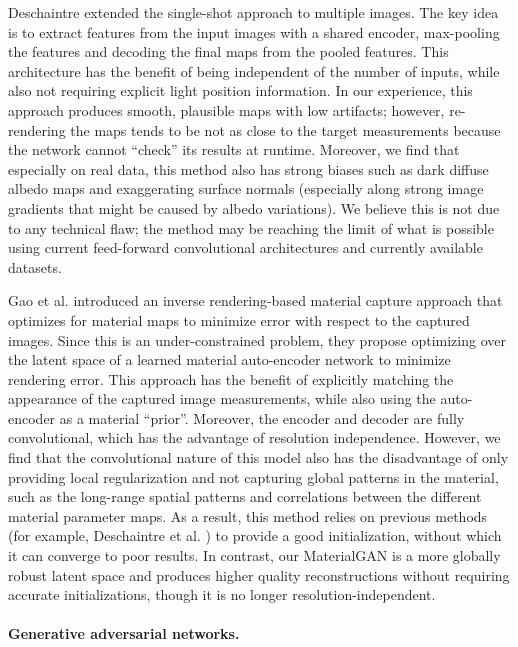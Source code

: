 Deschaintre \cite{deschaintre2019flexible} extended the single-shot approach to multiple images. The key idea is to extract features from the input images with a shared encoder, max-pooling the features and decoding the final maps from the pooled features. This architecture has the benefit of being independent of the number of inputs, while also not requiring explicit light position information. In our experience, this approach produces smooth, plausible maps with low artifacts; however, re-rendering the maps tends to be not as close to the target measurements because the network cannot ``check'' its results at runtime. Moreover, we find that especially on real data, this method also has strong biases such as dark diffuse albedo maps and exaggerating surface normals (especially along strong image gradients that might be caused by albedo variations). We believe this is not due to any technical flaw; the method may be reaching the limit of what is possible using current feed-forward convolutional architectures and currently available datasets.

Gao et al. \cite{gao2019deep} introduced an inverse rendering-based material capture approach that optimizes for material maps to minimize error with respect to the captured images. Since this is an under-constrained problem, they propose optimizing over the latent space of a learned material auto-encoder network to minimize rendering error. This approach has the benefit of explicitly matching the appearance of the captured image measurements, while also using the auto-encoder as a material ``prior''. Moreover, the encoder and decoder are fully convolutional, which has the advantage of resolution independence.
However, we find that the convolutional nature of this model also has the disadvantage of only providing local regularization and not capturing global patterns in the material, such as the long-range spatial patterns and correlations between the different material parameter maps. As a result, this method relies on previous methods (for example, Deschaintre et al. \cite{deschaintre2018single}) to provide a good initialization, without which it can converge to poor results.
In contrast, our MaterialGAN is a more globally robust latent space and produces higher quality reconstructions without requiring accurate initializations, though it is no longer resolution-independent.

\paragraph{Generative adversarial networks.}

